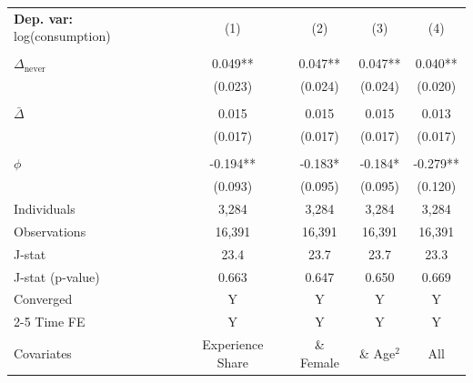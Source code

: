 \begin{tabular}{l cccc} \toprule  \textbf{Dep. var:}  log(consumption) 
                    &\multicolumn{1}{c}{(1)}   &\multicolumn{1}{c}{(2)}   &\multicolumn{1}{c}{(3)}   &\multicolumn{1}{c}{(4)}   \\
                    &               &               &               &               \\
\addlinespace
$\Delta_{\text{never}}$&       0.049** &       0.047** &       0.047** &       0.040** \\
                    &     (0.023)   &     (0.024)   &     (0.024)   &     (0.020)   \\
                    &               &               &               &               \\
\addlinespace
$\bar{\Delta}$      &       0.015   &       0.015   &       0.015   &       0.013   \\
                    &     (0.017)   &     (0.017)   &     (0.017)   &     (0.017)   \\
                    &               &               &               &               \\
\addlinespace
$\phi$              &      -0.194** &      -0.183*  &      -0.184*  &      -0.279** \\
                    &     (0.093)   &     (0.095)   &     (0.095)   &     (0.120)   \\
\addlinespace
Individuals         &       3,284   &       3,284   &       3,284   &       3,284   \\
Observations        &      16,391   &      16,391   &      16,391   &      16,391   \\
J-stat              &        23.4   &        23.7   &        23.7   &        23.3   \\
J-stat (p-value)    &       0.663   &       0.647   &       0.650   &       0.669   \\
Converged           &           Y   &           Y   &           Y   &           Y   \\
\cmidrule{2-5} Time FE & Y & Y & Y & Y \\ Covariates & Experience Share & \& Female & \& Age$^2$ & All \\ \bottomrule \end{tabular}

